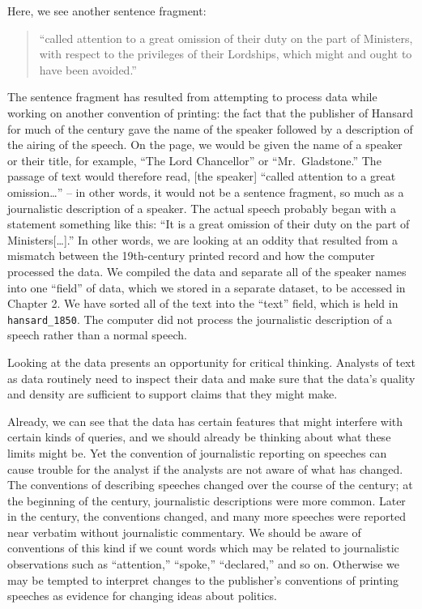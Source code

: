 \documentclass[
]{article}
\begin{document}
Here, we see another sentence fragment:

\begin{quote}
``called attention to a great omission of their duty on the part of
Ministers, with respect to the privileges of their Lordships, which
might and ought to have been avoided.''
\end{quote}

The sentence fragment has resulted from attempting to process data while
working on another convention of printing: the fact that the publisher
of Hansard for much of the century gave the name of the speaker followed
by a description of the airing of the speech. On the page, we would be
given the name of a speaker or their title, for example, ``The Lord
Chancellor'' or ``Mr.~Gladstone.'' The passage of text would therefore
read, {[}the speaker{]} ``called attention to a great omission\ldots{}''
-- in other words, it would not be a sentence fragment, so much as a
journalistic description of a speaker. The actual speech probably began
with a statement something like this: ``It is a great omission of their
duty on the part of Ministers{[}\ldots{]}.'' In other words, we are
looking at an oddity that resulted from a mismatch between the
19th-century printed record and how the computer processed the data. We
compiled the data and separate all of the speaker names into one
``field'' of data, which we stored in a separate dataset, to be accessed
in Chapter 2. We have sorted all of the text into the ``text'' field,
which is held in \texttt{hansard\_1850}. The computer did not process
the journalistic description of a speech rather than a normal speech.

Looking at the data presents an opportunity for critical thinking.
Analysts of text as data routinely need to inspect their data and make
sure that the data's quality and density are sufficient to support
claims that they might make.

Already, we can see that the data has certain features that might
interfere with certain kinds of queries, and we should already be
thinking about what these limits might be. Yet the convention of
journalistic reporting on speeches can cause trouble for the analyst if
the analysts are not aware of what has changed. The conventions of
describing speeches changed over the course of the century; at the
beginning of the century, journalistic descriptions were more common.
Later in the century, the conventions changed, and many more speeches
were reported near verbatim without journalistic commentary. We should
be aware of conventions of this kind if we count words which may be
related to journalistic observations such as ``attention,'' ``spoke,''
``declared,'' and so on. Otherwise we may be tempted to interpret
changes to the publisher's conventions of printing speeches as evidence
for changing ideas about politics.
\end{document}
